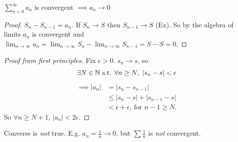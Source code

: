 \documentclass[twoside]{scrartcl}
\begin{document}
\begin{theorem}
$\sum_{n=0}^\infty a_n$ is convergent $\implies a_n \to 0$	
\end{theorem}

\begin{proof}
$S_n - S_{n-1} = a_n$. If $S_n \to S$ then $S_{n-1} \to S$ (Ex). So by the algebra of limits $a_n$ is convergent and $\lim_{n\to \infty} a_n = \lim_{n\to\infty} S_n - \lim_{n\to \infty} S_{n-1} = S - S = 0$.	
\end{proof}

\begin{proof}[Proof from first principles]
Fix $\epsilon >0$. $s_n \to s$, so 
\[\exists N\in\mathbb{N} \text{ s.t. } \forall n \geq N,~|s_n - s| < \epsilon\]
\[\begin{aligned}
\implies |a_n| &= |s_n - s_{n-1}| \\
&\leq |s_n - s| + |s_{n-1} - s| \\ 
&< \epsilon + \epsilon \text{, for } n-1 \geq N.	
\end{aligned}
\]
So $\forall n \geq N+1$, $|a_n| < 2\epsilon$. 
\end{proof}\vspace*{5pt}

\begin{remark}
Converse is \emph{not} true. E.g. $a_n = \frac{1}{n} \to 0$, but $\sum \frac{1}{n}$ is \emph{not} convergent. 	
\end{remark}~
\end{document}
